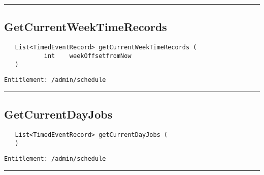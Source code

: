 \rule{12cm}{2pt}
\subsection{GetCurrentWeekTimeRecords}
\label{Api:GetCurrentWeekTimeRecords}
\begin{verbatim}
   List<TimedEventRecord> getCurrentWeekTimeRecords (
           int    weekOffsetfromNow
   )
\end{verbatim}
\begin{Verbatim}[fontsize=\small, formatcom=\color{Maroon}]
  Entitlement: /admin/schedule
\end{Verbatim}



\rule{12cm}{2pt}
\subsection{GetCurrentDayJobs}
\label{Api:GetCurrentDayJobs}
\begin{verbatim}
   List<TimedEventRecord> getCurrentDayJobs (
   )
\end{verbatim}
\begin{Verbatim}[fontsize=\small, formatcom=\color{Maroon}]
  Entitlement: /admin/schedule
\end{Verbatim}



\rule{12cm}{2pt}
